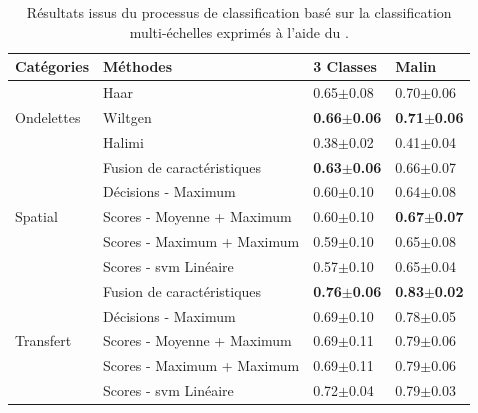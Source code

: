 \begin{table}[H]
    \centering
    \begin{tabular}{llll}
        \toprule
        Catégories                  & Méthodes                  & 3 Classes         & Malin             \\ \midrule
        \multirow{3}{*}{Ondelettes} & Haar                      & 0.65$\pm$0.08         & 0.70$\pm$0.06         \\
                                    & Wiltgen~\cite{Wiltgen2008}& \textbf{0.66$\pm$0.06}& \textbf{0.71$\pm$0.06}\\
                                    & Halimi~\cite{Halimi2017a} & 0.38$\pm$0.02         & 0.41$\pm$0.04         \\ \midrule
        \multirow{5}{*}{Spatial}    & Fusion de caractéristiques& \textbf{0.63$\pm$0.06}& 0.66$\pm$0.07         \\
                                    & Décisions - Maximum       & 0.60$\pm$0.10         & 0.64$\pm$0.08         \\
                                    & Scores - Moyenne + Maximum& 0.60$\pm$0.10         & \textbf{0.67$\pm$0.07}\\
                                    & Scores - Maximum + Maximum& 0.59$\pm$0.10         & 0.65$\pm$0.08         \\
                                    & Scores - \gls{svm} Linéaire& 0.57$\pm$0.10        & 0.65$\pm$0.04         \\ \midrule
        \multirow{5}{*}{Transfert}  & Fusion de caractéristiques& \textbf{0.76$\pm$0.06}& \textbf{0.83$\pm$0.02}\\
                                    & Décisions - Maximum       & 0.69$\pm$0.10         & 0.78$\pm$0.05         \\
                                    & Scores - Moyenne + Maximum& 0.69$\pm$0.11         & 0.79$\pm$0.06         \\
                                    & Scores - Maximum + Maximum& 0.69$\pm$0.11         & 0.79$\pm$0.06         \\
                                    & Scores - \gls{svm} Linéaire& 0.72$\pm$0.04        & 0.79$\pm$0.03         \\
        \bottomrule
    \end{tabular}
    \caption{Résultats issus du processus de classification basé sur la classification multi-échelles exprimés à l'aide du \fscore.}
    \vspace{-1em}
    \label{tab:results_image_improvement_multiresolution}
\end{table}

